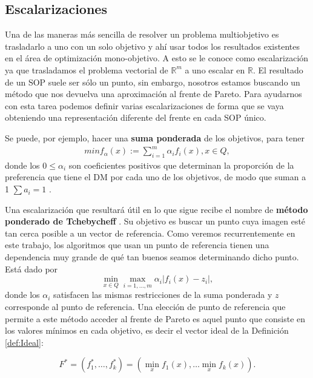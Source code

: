 \subsection{Escalarizaciones} \label{sec:Escalarizaciones}

Una de las maneras más sencilla de resolver un problema multiobjetivo es trasladarlo a uno con un solo objetivo y ahí usar todos los resultados existentes en el área de optimización mono-objetivo. A esto se le conoce como escalarización ya que trasladamos el problema vectorial de $\mathbb{R}^m$ a uno escalar en $\mathbb{R}$. El resultado de un SOP suele ser sólo un punto, sin embargo, nosotros estamos buscando un método que nos devuelva una aproximación al frente de Pareto. Para ayudarnos con esta tarea podemos definir varias escalarizaciones de forma que se vaya obteniendo una representación diferente del frente en cada SOP único.

Se puede, por ejemplo, hacer una \textbf{suma ponderada} \cite{zadehOptimalityNonscalarvaluedPerformance1963} de los objetivos, para tener
\begin{align} \label{eq:suma_ponderada}
    min f_\alpha(x):=\sum_{i=1}^m \alpha_i f_i(x), x\in Q,
\end{align}
donde los $0\leq \alpha_i$ son coeficientes positivos que determinan la proporción de la preferencia que tiene el DM por cada uno de los objetivos, de modo que suman a 1 $\sum a_i=1$ . 

Una escalarización que resultará útil en lo que sigue recibe el nombre de \textbf{método ponderado de Tchebycheff} \cite{bowmanRelationshipTchebycheffNorm1976}. Su objetivo es buscar un punto cuya imagen esté tan cerca posible a un vector de referencia. Como veremos recurrentemente en este trabajo, los algoritmos que usan un punto de referencia tienen una dependencia muy grande de qué tan buenos seamos determinando dicho punto. Está dado por
\begin{equation} \label{eq:tch_meth}
    \min_{x\in Q} \max_{i=1,\ldots,m} \alpha_i |f_i(x)-z_i|, \nonumber
\end{equation}
donde los $\alpha_i$ satisfacen las mismas restricciones de la suma ponderada y $z$ corresponde al punto de referencia. Una elección de punto de referencia  que permite a este método acceder al frente de Pareto es aquel punto que consiste en los valores mínimos en cada objetivo, es decir el vector ideal de la Definición \ref{def:Ideal}:

\begin{equation} \label{eq:vector_utopico}
    F^*=(f_1^*,\ldots,f_k^*)=(\min_x f_1(x), \ldots \min_x f_k(x)). \nonumber
\end{equation}


